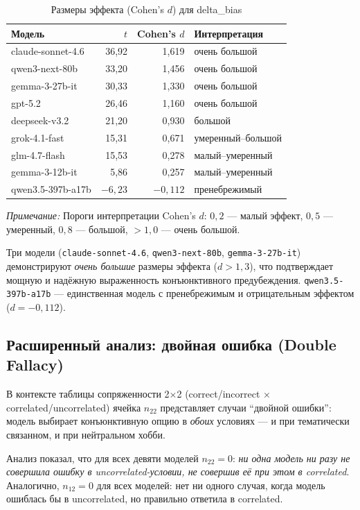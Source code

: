 \begin{table}[h!]
\caption{Размеры эффекта (Cohen's $d$) для delta\_bias}
\label{tab:effect_sizes}
\centering
\begin{tabular}{|l|r|r|l|}
\hline
\textbf{Модель} & \textbf{$t$} & \textbf{Cohen's $d$} & \textbf{Интерпретация} \\
\hline
claude-sonnet-4.6   &  36{,}92 & 1{,}619 & очень большой \\
qwen3-next-80b      &  33{,}20 & 1{,}456 & очень большой \\
gemma-3-27b-it      &  30{,}33 & 1{,}330 & очень большой \\
gpt-5.2             &  26{,}46 & 1{,}160 & очень большой \\
deepseek-v3.2       &  21{,}20 & 0{,}930 & большой \\
grok-4.1-fast       &  15{,}31 & 0{,}671 & умеренный--большой \\
glm-4.7-flash       &  15{,}53 & 0{,}278 & малый--умеренный \\
gemma-3-12b-it      &   5{,}86 & 0{,}257 & малый--умеренный \\
qwen3.5-397b-a17b   &  $-6{,}23$ & $-0{,}112$ & пренебрежимый \\
\hline
\end{tabular}
\end{table}

\textit{Примечание:} Пороги интерпретации Cohen's $d$: $0{,}2$ --- малый эффект, $0{,}5$ --- умеренный, $0{,}8$ --- большой, $>1{,}0$ --- очень большой.

Три модели (\texttt{claude-sonnet-4.6}, \texttt{qwen3-next-80b}, \texttt{gemma-3-27b-it}) демонстрируют \textit{очень большие} размеры эффекта ($d > 1{,}3$), что подтверждает мощную и надёжную выраженность конъюнктивного предубеждения. \texttt{qwen3.5-397b-a17b} --- единственная модель с пренебрежимым и отрицательным эффектом ($d = -0{,}112$).

\subsection{Расширенный анализ: двойная ошибка (Double Fallacy)}

В контексте таблицы сопряженности 2$\times$2 (correct/incorrect $\times$ correlated/uncorrelated) ячейка $n_{22}$ представляет случаи ``двойной ошибки'': модель выбирает конъюнктивную опцию в \textit{обоих} условиях --- и при тематически связанном, и при нейтральном хобби.

Анализ показал, что для всех девяти моделей $n_{22} = 0$: \textit{ни одна модель ни разу не совершила ошибку в uncorrelated-условии, не совершив её при этом в correlated}. Аналогично, $n_{12} = 0$ для всех моделей: нет ни одного случая, когда модель ошиблась бы в uncorrelated, но правильно ответила в correlated.

